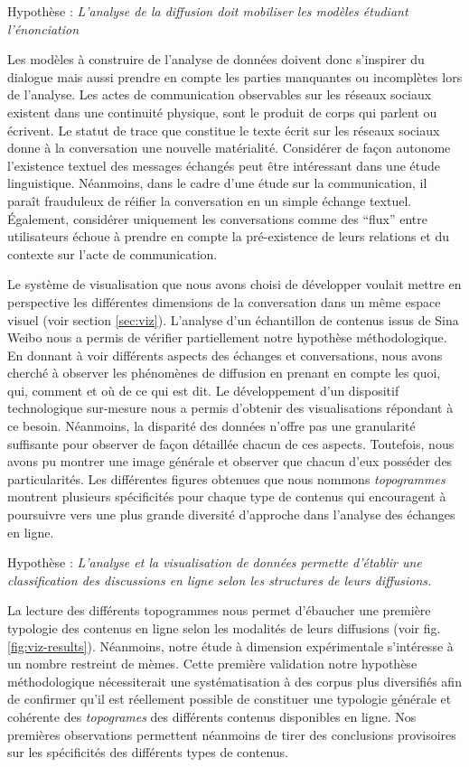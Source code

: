 Hypothèse : \textit{L'analyse de la diffusion doit mobiliser les modèles étudiant l'énonciation} 

Les modèles à construire de l'analyse de données doivent donc s'inspirer du dialogue mais aussi prendre en compte les parties manquantes ou incomplètes lors de l'analyse. Les actes de communication observables sur les réseaux sociaux existent dans une continuité physique, sont le produit de corps qui parlent ou écrivent. Le statut de trace que constitue le texte écrit sur les réseaux sociaux donne à la conversation une nouvelle matérialité. Considérer de façon autonome l'existence textuel des messages échangés peut être intéressant dans une étude linguistique. Néanmoins, dans le cadre d'une étude sur la communication, il paraît frauduleux de réifier la conversation en un simple échange textuel. Également, considérer uniquement les conversations comme des ``flux'' entre utilisateurs échoue à prendre en compte la pré-existence de leurs relations et du contexte sur l'acte de communication. 

Le système de visualisation que nous avons choisi de développer voulait mettre en perspective les différentes dimensions de la conversation dans un même espace visuel (voir section \ref{sec:viz}). L'analyse d'un échantillon de contenus issus de Sina Weibo nous a permis de vérifier partiellement notre hypothèse méthodologique. En donnant à voir différents aspects des échanges et conversations, nous avons cherché à observer les phénomènes de diffusion en prenant en compte les quoi, qui, comment et où de ce qui est dit. Le développement d'un dispositif technologique sur-mesure nous a permis d'obtenir des visualisations répondant à ce besoin. Néanmoins, la disparité des données n'offre pas une granularité suffisante pour observer de façon détaillée chacun de ces aspects. Toutefois, nous avons pu montrer une image générale et observer que chacun d'eux posséder des particularités. Les différentes figures obtenues que nous nommons \textit{topogrammes} montrent plusieurs spécificités pour chaque type de contenus qui encouragent à poursuivre vers une plus grande diversité d'approche dans l'analyse des échanges en ligne.

Hypothèse : \textit{L'analyse et la visualisation de données permette d'établir une classification des discussions en ligne selon les structures de leurs diffusions.}


La lecture des différents topogrammes nous permet d'ébaucher une première typologie des contenus en ligne selon les modalités de leurs diffusions (voir fig. \ref{fig:viz-results}). Néanmoins, notre étude à dimension expérimentale s'intéresse à un nombre restreint de mèmes. Cette première validation notre hypothèse méthodologique nécessiterait une systématisation à des corpus plus diversifiés afin de confirmer qu'il est réellement possible de constituer une typologie générale et cohérente des \textit{topogrames} des différents contenus disponibles en ligne. Nos premières observations permettent néanmoins de tirer des conclusions provisoires sur les spécificités des différents types de contenus.


